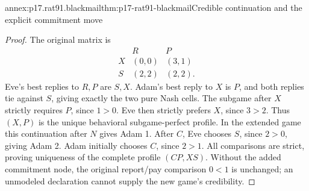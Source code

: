 \begin{annexitem}{annex:p17.rat91.blackmail}{thm:p17-rat91-blackmail}{Credible continuation and the explicit commitment move}
\begin{proof}
The original matrix is
\[
\begin{array}{c|cc}&R&P\\\hline
 X&(0,0)&(3,1)\\S&(2,2)&(2,2).
\end{array}
\]
Eve's best replies to \(R,P\) are \(S,X\).
Adam's best reply to \(X\) is \(P\), and
both replies tie against \(S\), giving exactly
the two pure Nash cells. The subgame after
\(X\) strictly requires \(P\), since \(1>0\).
Eve then strictly prefers \(X\), since \(3>2\).
Thus \((X,P)\) is the unique behavioral
subgame-perfect profile.
In the extended game this continuation after
\(N\) gives Adam 1. After \(C\), Eve chooses
\(S\), since \(2>0\), giving Adam 2. Adam
initially chooses \(C\), since \(2>1\).
All comparisons are strict, proving uniqueness
of the complete profile \((CP,XS)\).
Without the added commitment node, the original
report/pay comparison \(0<1\) is unchanged;
an unmodeled declaration cannot supply the
new game's credibility.
\end{proof}
\end{annexitem}


